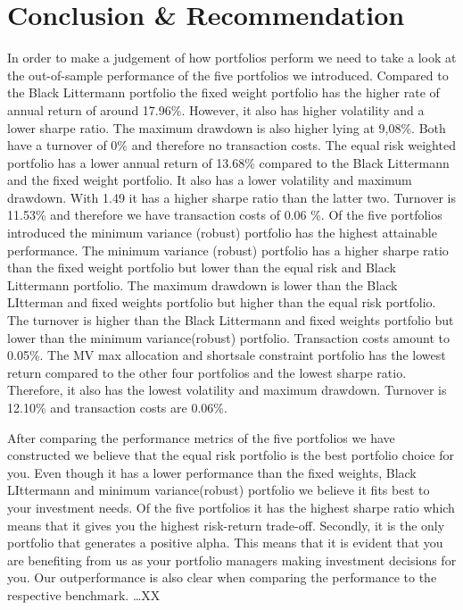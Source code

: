 \documentclass{scrreprt}
\begin{document}
\chapter*{Conclusion \& Recommendation}
In order to make a judgement of how portfolios perform we need to take a look at the out-of-sample performance of the five portfolios we introduced. 
Compared to the Black Littermann portfolio the fixed weight portfolio has the higher rate of annual return of around 17.96\%. However, it also has higher volatility and a lower sharpe ratio.
The maximum drawdown is also higher lying at 9,08\%.
Both have a turnover of 0\% and therefore no transaction costs. 
The equal risk weighted portfolio has a lower annual return of 13.68\% compared to the Black Littermann and the fixed weight portfolio. It also has a lower volatility and maximum drawdown. With 1.49 it has a higher sharpe ratio than the latter two. Turnover is 11.53\% and therefore we have transaction costs of
0.06 \%. 
Of the five portfolios introduced the minimum variance (robust) portfolio has the highest attainable performance.
The minimum variance (robust) portfolio has a higher sharpe ratio than the fixed weight portfolio but lower than the equal risk and Black Littermann portfolio.
The maximum drawdown is lower than the Black LItterman and fixed weights portfolio but higher than the equal risk portfolio.
The turnover is higher than the Black Littermann and fixed weights portfolio but lower than the minimum variance(robust) portfolio.
Transaction costs amount to 0.05\%.
The MV max allocation and shortsale constraint portfolio has the lowest return compared to the other four portfolios and the lowest sharpe ratio. Therefore, it also has the lowest volatility and maximum drawdown.
Turnover is 12.10\% and transaction costs are 0.06\%. 

After comparing the performance metrics of the five portfolios we have constructed we believe that the equal risk portfolio is the best portfolio choice for you.
Even though it has a lower performance than the fixed weights, Black LIttermann and minimum variance(robust) portfolio we believe it fits best to your investment needs.
Of the five portfolios it has the highest sharpe ratio which means that it gives you the highest risk-return trade-off.
Secondly, it is the only portfolio that generates a positive alpha.
This means that it is evident that you are benefiting from us as your portfolio managers making investment decisions for you.
Our outperformance is also clear when comparing the performance to the respective benchmark. …XX
\end{document}

